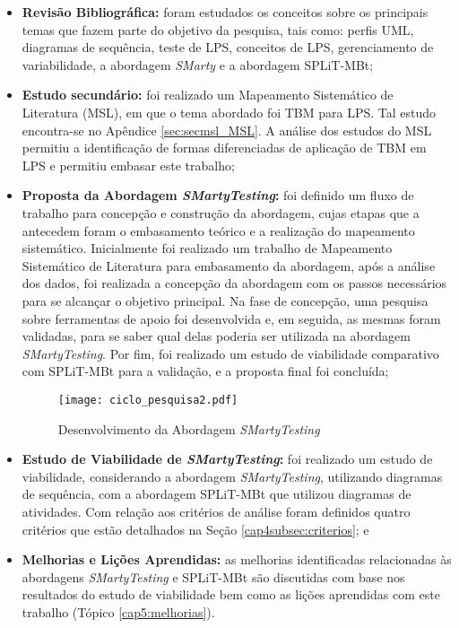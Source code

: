 \begin{itemize}
	\item \textbf{Revisão Bibliográfica:} foram estudados os conceitos sobre os principais temas que fazem parte do objetivo da pesquisa, tais como: perfis UML, diagramas de sequência, teste de LPS, conceitos de LPS, gerenciamento de variabilidade, a abordagem \textit{SMarty} e a abordagem SPLiT-MBt;
	
	\item \textbf{Estudo secundário:} foi realizado um Mapeamento Sistemático de Literatura (MSL), em que o tema abordado foi TBM para LPS. Tal estudo encontra-se no Apêndice \ref{sec:secmsl_MSL}. A análise dos estudos do MSL permitiu a identificação de formas diferenciadas de aplicação de TBM em LPS e permitiu embasar este trabalho;
	
	\item \textbf{Proposta da Abordagem \textit{SMartyTesting}:} foi definido um fluxo de trabalho para concepção e construção da abordagem, cujas etapas que a antecedem foram o embasamento teórico e a realização do mapeamento sistemático. Inicialmente foi realizado um trabalho de Mapeamento Sistemático de Literatura para embasamento da abordagem, após a análise dos dados, foi realizada a concepção da abordagem com os passos necessários para se alcançar o objetivo principal. Na fase de concepção, uma pesquisa sobre ferramentas de apoio foi desenvolvida e, em seguida, as mesmas foram validadas, para se saber qual delas poderia ser utilizada na abordagem \textit{SMartyTesting}. Por fim, foi realizado um estudo de viabilidade comparativo com SPLiT-MBt para a validação, e a proposta final foi concluída;
		
	\begin{figure}[h!]
		\centering
		\texttt{[image: ciclo\_pesquisa2.pdf]}
		\caption{Desenvolvimento da Abordagem \textit{SMartyTesting}}
		\label{fig:fluxopesquisa2}
	\end{figure}
	
	\item \textbf{Estudo de Viabilidade de \textit{SMartyTesting}:} foi realizado um estudo de viabilidade, considerando a abordagem \textit{SMartyTesting}, utilizando diagramas de sequência, com a abordagem SPLiT-MBt que utilizou diagramas de atividades. Com relação aos critérios de análise foram definidos quatro critérios que estão detalhados na Seção \ref{cap4subsec:criterios}; e
	
	\item \textbf{Melhorias e Lições Aprendidas:} as melhorias identificadas relacionadas às abordagens \textit{SMartyTesting} e SPLiT-MBt são discutidas com base nos resultados do estudo de viabilidade bem como as lições aprendidas com este trabalho (Tópico \ref{cap5:melhorias}).
\end{itemize}


